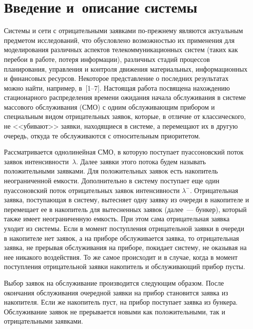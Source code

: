       \begin{multicols}{2}

            \label{st\stat}


\section{Введение и~описание системы}

Системы и сети с отрицательными заявками по-преж\-не\-му являются
актуальным предметом исследований, что обусловлено возможностью их
применения для моделирования различных аспектов телекоммуникационных
систем (таких как перебои в работе, потеря информации), различных
стадий процессов планирования, управления и контроля движения
материальных, информационных и финансовых ресурсов. Некоторое
представление о последних результатах можно найти, например, в~[1--7]. Настоящая работа посвящена нахождению стационарного
распределения времени ожидания начала обслуживания в системе массового
обслуживания (СМО) с одним обслуживающим прибором и специальным
видом отрицательных заявок, которые, в отличие от классического, не
<<убивают>> заявки, находящиеся в системе, а перемещают их в другую
очередь, откуда те обслуживаются с относительным приоритетом.

Рассматривается однолинейная СМО, в которую поступает пуассоновский поток заявок
интенсивности~$\lambda$. Далее заявки этого потока будем называть
положительными заявками. Для положительных заявок есть накопитель неограниченной емкости.
Дополнительно в сис\-те\-му поступает еще один пуассоновский поток отрицательных заявок
интенсивности $\lambda^-$. Отрицательная заявка, поступающая в
систему, вытесняет одну заявку из очереди в накопителе и
перемещает ее в накопитель для вытесненных заявок (далее~--- бун\-кер),
который также имеет неограниченную емкость. При этом сама отрицательная
заявка уходит из системы.
Если в момент поступления отрицательной заявки в очереди в накопителе нет
заявок, а на приборе обслуживается заявка, то
отрицательная заявка, не прерывая обслуживания на приборе,
покидает сис\-те\-му, не оказывая на нее никакого воздействия.
То же самое происходит и в случае, когда в момент поступления
отрицательной заявки накопитель и обслуживающий прибор пусты.

Выбор заявок на обслуживание производится следующим образом.
После окончания обслуживания очередной заявки на прибор
становится заявка из накопителя. Если же накопитель пуст, на прибор поступает заявка из бункера.
Обслуживание заявок не прерывается новыми как положительными, так
и отрицательными заявками.


\end{multicols}
